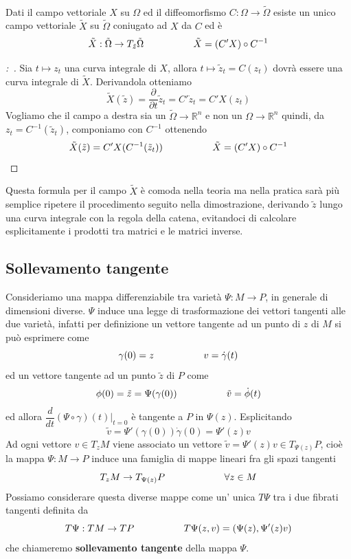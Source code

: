 \documentclass[11pt,a4paper,twoside]{book}
\newenvironment{proposizione}[1][\empty]{\begin{Proposizione}{
\ifx\empty#1\relax\else\mdseries\itshape#1\\\fi
}{}}{\end{Proposizione}}
\newenvironment{dimo}[1][\proofname]{
	\begin{tcolorbox}[
	breakable, 
	enhanced, 
	interior hidden, 
	frame hidden, 
	borderline west = {1pt}{0pt}{gray}, 
	top=0pt, bottom=0pt, left=0pt]
\begin{proof}[#1:~]
}
{
\end{proof}
\end{tcolorbox}
}
\theoremstyle{esss}
\theoremstyle{dotless}
\numberwithin{equation}{section} %
\begin{document}
\begin{proposizione}\label{propCampoConiugato}
Dati il campo vettoriale $X$ su $\Omega$ ed il diffeomorfismo $C:\Omega\rightarrow\tilde{\Omega}$ esiste un unico campo vettoriale $\tilde{X}$ su $\tilde{\Omega}$ coniugato ad $X$ da $C$ ed è
\[
\tilde{X}:\tilde{\Omega}\rightarrow T_{\tilde{z}}\tilde{\Omega} \hspace{0.15\linewidth} \tilde{X}=(C'X)\circ C^{-1}
\]
\end{proposizione}
\begin{dimo}
Sia $t\mapsto z_t$ una curva integrale di $X$, allora $t\mapsto \tilde{z}_t=C(z_t)$ dovrà essere una curva integrale di $\tilde{X}$. Derivandola otteniamo
\[
\tilde{X}(\tilde{z}) = \dfrac{\partial}{\partial t} \tilde{z}_t = C' \dot{z}_t = C'X(z_t)
\]
Vogliamo che il campo a destra sia un $\tilde{\Omega}\rightarrow\mathbb{R}^n$ e non un $\Omega\rightarrow\mathbb{R}^n$ quindi, da $z_t=C^{-1}(\tilde{z}_t)$, componiamo con $C^{-1}$ ottenendo
\[
\tilde{X}(\tilde{z}) = C'X (C^{-1}(\tilde{z}_t))\hspace{0.15\linewidth}\tilde{X}=(C'X)\circ C^{-1} \qedhere
\]
\end{dimo}

Questa formula per il campo $\tilde{X}$ è comoda nella teoria ma nella pratica sarà più semplice ripetere il procedimento seguito nella dimostrazione, derivando $\tilde{z}$ lungo una curva integrale con la regola della catena, evitandoci di calcolare esplicitamente i prodotti tra matrici e le matrici inverse.

\subsection{Sollevamento tangente}\label{sezSollevamentoTangente}
Consideriamo una mappa differenziabile tra varietà $\Psi:M\rightarrow P$, in generale di dimensioni diverse.
$\Psi$ induce una legge di trasformazione dei vettori tangenti alle due varietà, infatti per definizione un vettore tangente ad un punto di $z$ di $M$ si può esprimere come
\[
\gamma(0)=z \hspace{0.15\linewidth} v=\dot{\gamma}(t) 
\]
ed un vettore tangente ad un punto $\tilde{z}$ di $P$ come
\[
\phi(0)=\tilde{z}=\Psi(\gamma(0)) \hspace{0.15\linewidth} \tilde{v}=\dot{\phi}(t)
\]
ed allora $\dfrac{d}{dt} \left(\Psi\circ\gamma\right)(t)|_{t=0}$ è tangente a $P$ in $\Psi(z)$. Esplicitando
\[
\tilde{v}=\Psi'(\gamma(0))\dot{\gamma}(0)=\Psi'(z) v
\]
Ad ogni vettore $v\in T_zM$ viene associato un vettore $\tilde{v}=\Psi'(z)v\in T_{\Psi(z)}P$, cioè la mappa $\Psi:M\rightarrow P$ induce una famiglia di mappe lineari fra gli spazi tangenti
\[
T_zM\rightarrow T_{\Psi(z)}P \hspace{0.15\linewidth} \quad \forall z\in M
\]
Possiamo considerare questa diverse mappe come un' unica $T\Psi$ tra i due fibrati tangenti definita da
\begin{equation}
T\Psi:TM\rightarrow TP \hspace{0.15\linewidth} T\Psi(z,v)=(\Psi(z),\Psi'(z)v)
\end{equation}
che chiameremo \textbf{sollevamento tangente} della mappa $\Psi$.
\end{document}
